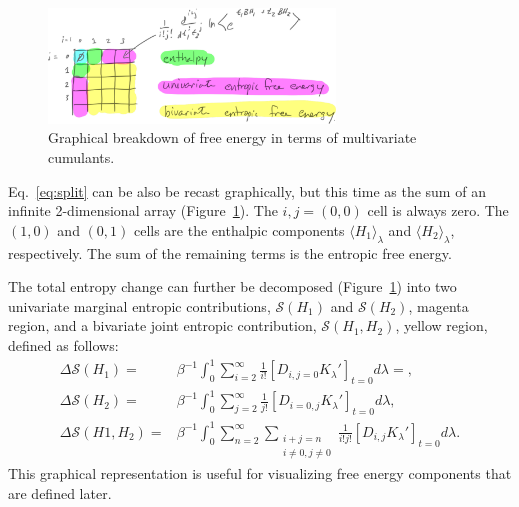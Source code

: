 \documentclass{article}
\begin{document}
\begin{figure}[tb]
\centering
\includegraphics[width=3in]{figure2.pdf}
\caption{Graphical breakdown of free energy in terms of multivariate cumulants.}
\label{fig:2D}
\end{figure}

Eq.~\ref{eq:split} can be also be recast graphically, but this time as the sum of an infinite 2-dimensional array (Figure~\ref{fig:2D}). The $i,j=(0,0)$ cell is always zero. The $(1,0)$ and $(0,1)$ cells are the enthalpic components $\langle H_1 \rangle_\lambda$ and $\langle H_2 \rangle_\lambda$, respectively. The sum of the remaining terms is the entropic free energy. 



The total entropy change can further be decomposed (Figure~\ref{fig:2D}) into two univariate marginal entropic contributions, $\mathcal{S}(H_1)$ and $\mathcal{S}(H_2)$, magenta region, and a bivariate joint entropic contribution, $\mathcal{S}(H_1, H_2)$, yellow region, defined as follows:
\begin{align}
\Delta \mathcal{S}(H_1) =& 
\beta^{-1} \int_0^1 \sum_{i=2}^{\infty} \frac{1}{i!}
    \left[ D_{i,j=0} K_\lambda' \right]_{t=0} d\lambda = , 
    \\ 
    \Delta \mathcal{S}(H_2) =& 
    \beta^{-1} \int_0^1 \sum_{j=2}^{\infty} \frac{1}{j!}
    \left[ D_{i=0,j}K_\lambda' \right]_{t=0} d\lambda , 
        \\ 
    \Delta \mathcal{S}(H1,H_2) =& 
    \beta^{-1} \int_0^1 \sum_{n=2}^{\infty} \sum_{\substack{i+j=n \\ i\neq0,j\neq0}} \frac{1}{i!j!}
        \left[ D_{i,j}K_\lambda' \right]_{t=0} d\lambda . 
\label{eq:mult_expansion}
\end{align}
This graphical representation is useful for visualizing free energy components that are defined later. 
\end{document}
